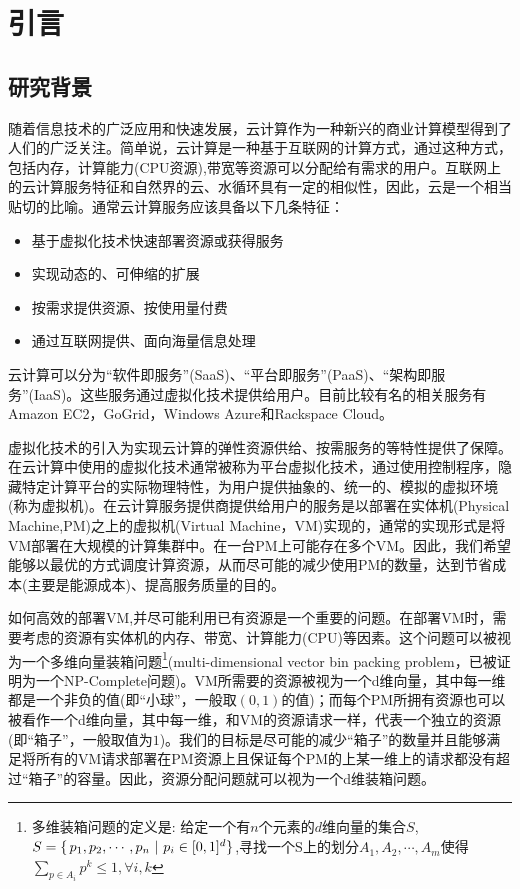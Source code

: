 
\chapter{引言}
\label{chap:1}

\section{研究背景}
\label{sec:background}

随着信息技术的广泛应用和快速发展，云计算作为一种新兴的商业计算模型得到了人们的广泛关注。简单说，云计算是一种基于互联网的计算方式，通过这种方式，包括内存，计算能力(CPU资源),带宽等资源可以分配给有需求的用户。互联网上的云计算服务特征和自然界的云、水循环具有一定的相似性，因此，云是一个相当贴切的比喻。通常云计算服务应该具备以下几条特征：
\begin{itemize}
\item 基于虚拟化技术快速部署资源或获得服务
\item 实现动态的、可伸缩的扩展
\item 按需求提供资源、按使用量付费
\item 通过互联网提供、面向海量信息处理
\end{itemize}

云计算可以分为``软件即服务''(SaaS)、``平台即服务''(PaaS)、``架构即服务''(IaaS)。这些服务通过虚拟化技术提供给用户。目前比较有名的相关服务有Amazon EC2，GoGrid，Windows Azure和Rackspace Cloud。

虚拟化技术的引入为实现云计算的弹性资源供给、按需服务的等特性提供了保障。在云计算中使用的虚拟化技术通常被称为平台虚拟化技术，通过使用控制程序，隐藏特定计算平台的实际物理特性，为用户提供抽象的、统一的、模拟的虚拟环境(称为虚拟机)。在云计算服务提供商提供给用户的服务是以部署在实体机(Physical Machine,PM)之上的虚拟机(Virtual Machine，VM)实现的，通常的实现形式是将VM部署在大规模的计算集群中。在一台PM上可能存在多个VM。因此，我们希望能够以最优的方式调度计算资源，从而尽可能的减少使用PM的数量，达到节省成本(主要是能源成本)、提高服务质量的目的。

如何高效的部署VM,并尽可能利用已有资源是一个重要的问题。在部署VM时，需要考虑的资源有实体机的内存、带宽、计算能力(CPU)等因素。这个问题可以被视为一个多维向量装箱问题\footnote{多维装箱问题的定义是: {\kai 给定一个有$n$个元素的$d$维向量的集合$S$,$S = \{\thinspace p_1,p_2,\cdots,p_n\ |\ p_i \in [0,1]^d \}$,寻找一个S上的划分$A_1,A_2,\cdots,A_m$使得$\sum_{p \in A_i}p^k\leq 1,\forall i,k$}}(multi-dimensional vector bin packing problem，已被证明为一个NP-Complete问题\cite{Garey76})。VM所需要的资源被视为一个d维向量，其中每一维都是一个非负的值(即``小球''，一般取$(0,1)$的值)；而每个PM所拥有资源也可以被看作一个d维向量，其中每一维，和VM的资源请求一样，代表一个独立的资源(即``箱子''，一般取值为$1$)。我们的目标是尽可能的减少``箱子''的数量并且能够满足将所有的VM请求部署在PM资源上且保证每个PM的上某一维上的请求都没有超过``箱子''的容量。因此，资源分配问题就可以视为一个d维装箱问题。



